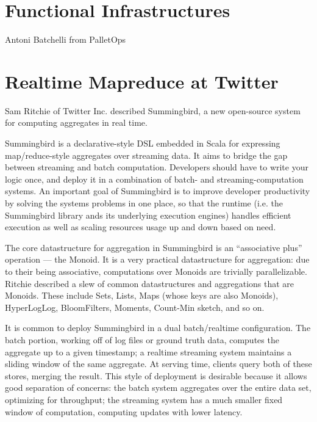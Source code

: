 \documentclass{jfp1}
\begin{document}
\section{Functional Infrastructures}


Antoni Batchelli from PalletOps

\section{Realtime Mapreduce at Twitter}


Sam Ritchie of Twitter Inc. described Summingbird, a new open-source
system for computing aggregates in real time.

Summingbird is a declarative-style DSL embedded in Scala for expressing map/reduce-style
aggregates over streaming data. It aims to bridge the gap between
streaming and batch computation. Developers should have to write your logic
once, and deploy it in a combination of batch- and
streaming-computation systems. An important goal of Summingbird is to
improve developer productivity by solving the systems problems in one
place, so that the runtime (i.e. the Summingbird library ands its
underlying execution engines) handles efficient execution as well as
scaling resources usage up and down based on need.

The core datastructure for aggregation in Summingbird is an
``associative plus'' operation --- the Monoid. It is a very practical
datastructure for aggregation: due to their being associative,
computations over Monoids are trivially parallelizable. Ritchie
described a slew of common datastructures and aggregations that are
Monoids. These include Sets, Lists, Maps (whose keys are also
Monoids), HyperLogLog, BloomFilters, Moments, Count-Min sketch, and so on.

It is common to deploy Summingbird in a dual batch/realtime
configuration. The batch portion, working off of log files or ground
truth data, computes the aggregate up to a given timestamp; a realtime
streaming system maintains a sliding window of the same aggregate. At
serving time, clients query both of these stores, merging the result.
This style of deployment is desirable because it allows good
separation of concerns: the batch system aggregates over the entire
data set, optimizing for throughput; the streaming system has a much
smaller fixed window of computation, computing updates with lower
latency.
\end{document}
